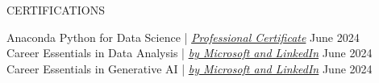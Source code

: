 \begin{rSection}{CERTIFICATIONS}

    {Anaconda Python for Data Science} | \href{https://www.linkedin.com/learning/certificates/4f793772d84e101772da3b9d18c07030b6cc7aac590ebdb5f60daa46301f43d3?u=90799586}{\textit{Professional Certificate}} \hfill {June 2024} \\   
    {Career Essentials in Data Analysis} | \href{https://www.linkedin.com/learning/certificates/0b7ca5c28084084194c6e8cd821574cd61eeb1c4505fb94d99f1fc9ea21edfc5?u=90799586}{\textit{by Microsoft and LinkedIn}} \hfill {June 2024} \\  
    {Career Essentials in Generative AI} | \href{https://www.linkedin.com/learning/certificates/656804fa74acc29a8698e8ccbf3394c5f35c45a96180313ceb3d6b847bf75fda?u=90799586}{\textit{by Microsoft and LinkedIn}} \hfill {June 2024}

\end{rSection}
